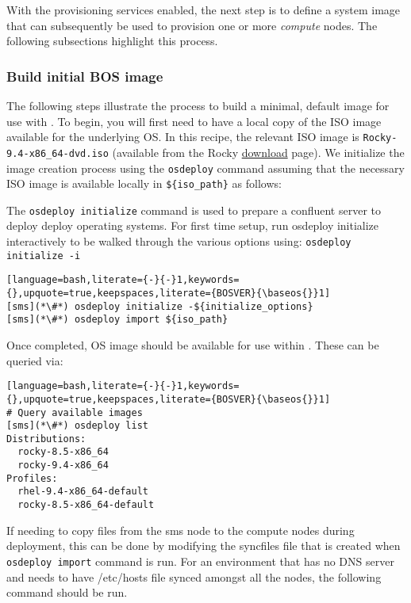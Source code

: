 
With the provisioning services enabled, the next step is to define
a system image that can subsequently be
used to provision one or more {\em compute} nodes. The following subsections highlight this process.

\subsubsection{Build initial BOS image} \label{sec:assemble_bos}
The following steps illustrate the process to build a minimal, default image for use with \Confluent{}. To begin, you will
first need to have a local copy of the ISO image available for the underlying OS. In this recipe, the relevant ISO image
is \texttt{Rocky-9.4-x86\_64-dvd.iso} (available from the Rocky
\href{https://rockylinux.org/download/}{\color{blue}download} page).
We initialize the image
creation process using the \texttt{osdeploy} command assuming that the necessary ISO image is available locally in
\texttt{\$\{iso\_path\}} as follows:

The \texttt{osdeploy initialize} command is used to prepare a confluent server to deploy deploy operating systems.
For first time setup, run osdeploy initialize interactively to be walked through the various options using: 
\texttt{osdeploy initialize -i}

\begin{lstlisting}[language=bash,literate={-}{-}1,keywords={},upquote=true,keepspaces,literate={BOSVER}{\baseos{}}1]
[sms](*\#*) osdeploy initialize -${initialize_options}
[sms](*\#*) osdeploy import ${iso_path}

\end{lstlisting}

\noindent Once completed, OS image should be available for use within \Confluent{}. These can be queried via:

\begin{lstlisting}[language=bash,literate={-}{-}1,keywords={},upquote=true,keepspaces,literate={BOSVER}{\baseos{}}1]
# Query available images
[sms](*\#*) osdeploy list
Distributions:
  rocky-8.5-x86_64
  rocky-9.4-x86_64
Profiles:
  rhel-9.4-x86_64-default
  rocky-8.5-x86_64-default
\end{lstlisting}

If needing to copy files from the sms node to the compute nodes during deployment, this can be done by
modifying the syncfiles file that is created when \texttt{osdeploy import} command is run. For an environment
that has no DNS server and needs to have /etc/hosts file synced amongst all the nodes, the following command
should be run.   

